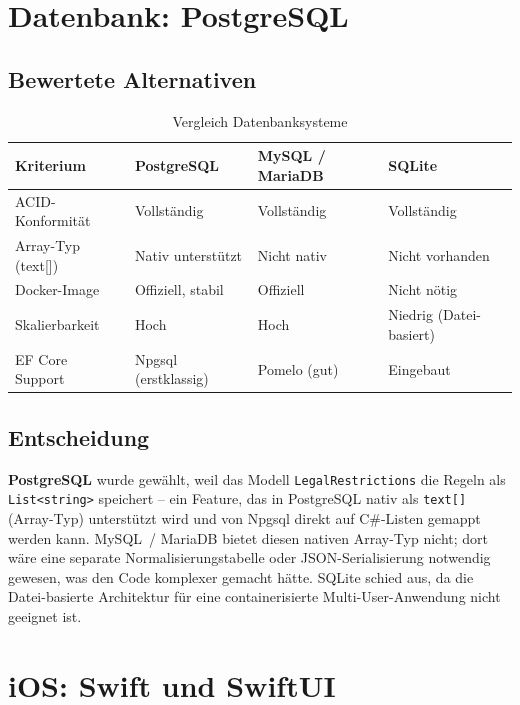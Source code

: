\section{Datenbank: PostgreSQL}
\label{sec:postgresql}

\subsection{Bewertete Alternativen}
\label{subsec:db-alternativen}

\begin{table}[H]
  \centering
  \caption{Vergleich Datenbanksysteme}
  \label{tab:db-vergleich}
  \small
  \begin{tabularx}{\textwidth}{|l|Y|Y|Y|}
    \hline
    \textbf{Kriterium} & \textbf{PostgreSQL} & \textbf{MySQL / MariaDB} & \textbf{SQLite} \\
    \hline
    ACID-Konformität  & Vollständig & Vollständig & Vollständig \\
    \hline
    Array-Typ (text[]) & Nativ unterstützt & Nicht nativ & Nicht vorhanden \\
    \hline
    Docker-Image      & Offiziell, stabil & Offiziell & Nicht nötig \\
    \hline
    Skalierbarkeit    & Hoch & Hoch & Niedrig (Datei-basiert) \\
    \hline
    EF Core Support   & Npgsql (erstklassig) & Pomelo (gut) & Eingebaut \\
    \hline
  \end{tabularx}
\end{table}

\subsection{Entscheidung}
\label{subsec:postgresql-entscheidung}

\textbf{PostgreSQL} wurde gewählt, weil das Modell \texttt{LegalRestrictions} die Regeln
als \texttt{List<string>} speichert – ein Feature, das in PostgreSQL nativ als
\texttt{text[]} (Array-Typ) unterstützt wird und von Npgsql direkt auf C\#-Listen
gemappt werden kann. MySQL~/ MariaDB bietet diesen nativen Array-Typ nicht; dort wäre
eine separate Normalisierungstabelle oder JSON-Serialisierung notwendig gewesen, was den
Code komplexer gemacht hätte. SQLite schied aus, da die Datei-basierte Architektur für
eine containerisierte Multi-User-Anwendung nicht geeignet ist.

\section{iOS: Swift und SwiftUI}
\label{sec:swiftui}


